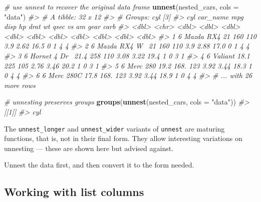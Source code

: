 \documentclass[]{book}
\newenvironment{Shaded}{}{}
\newcommand{\CommentTok}[1]{\textcolor[rgb]{0.38,0.63,0.69}{\textit{#1}}}
\newcommand{\DataTypeTok}[1]{\textcolor[rgb]{0.56,0.13,0.00}{#1}}
\newcommand{\KeywordTok}[1]{\textcolor[rgb]{0.00,0.44,0.13}{\textbf{#1}}}
\newcommand{\NormalTok}[1]{#1}
\newcommand{\OperatorTok}[1]{\textcolor[rgb]{0.40,0.40,0.40}{#1}}
\newcommand{\StringTok}[1]{\textcolor[rgb]{0.25,0.44,0.63}{#1}}
\begin{document}
\begin{Shaded}
\begin{Highlighting}[]
\CommentTok{# use unnest to recover the original data frame}
\KeywordTok{unnest}\NormalTok{(nested_cars, }\DataTypeTok{cols =} \StringTok{"data"}\NormalTok{)}
\CommentTok{#> # A tibble: 32 x 12}
\CommentTok{#> # Groups:   cyl [3]}
\CommentTok{#>     cyl car_name       mpg  disp    hp  drat    wt  qsec    vs    am  gear  carb}
\CommentTok{#>   <dbl> <chr>        <dbl> <dbl> <dbl> <dbl> <dbl> <dbl> <dbl> <dbl> <dbl> <dbl>}
\CommentTok{#> 1     6 Mazda RX4     21    160    110  3.9   2.62  16.5     0     1     4     4}
\CommentTok{#> 2     6 Mazda RX4 W~  21    160    110  3.9   2.88  17.0     0     1     4     4}
\CommentTok{#> 3     6 Hornet 4 Dr~  21.4  258    110  3.08  3.22  19.4     1     0     3     1}
\CommentTok{#> 4     6 Valiant       18.1  225    105  2.76  3.46  20.2     1     0     3     1}
\CommentTok{#> 5     6 Merc 280      19.2  168.   123  3.92  3.44  18.3     1     0     4     4}
\CommentTok{#> 6     6 Merc 280C     17.8  168.   123  3.92  3.44  18.9     1     0     4     4}
\CommentTok{#> # ... with 26 more rows}

\CommentTok{# unnesting preserves groups}
\KeywordTok{groups}\NormalTok{(}\KeywordTok{unnest}\NormalTok{(nested_cars, }\DataTypeTok{cols =} \StringTok{"data"}\NormalTok{))}
\CommentTok{#> [[1]]}
\CommentTok{#> cyl}
\end{Highlighting}
\end{Shaded}

The \texttt{unnest\_longer} and \texttt{unnest\_wider} variants of \texttt{unnest} are maturing functions, that is, not in their final form. They allow interesting variations on unnesting --- these are shown here but advised against.

Unnest the data first, and then convert it to the form needed.

\begin{Shaded}
\end{Shaded}

\hypertarget{working-with-list-columns}{%
\subsection{Working with list columns}\label{working-with-list-columns}}
\end{document}
